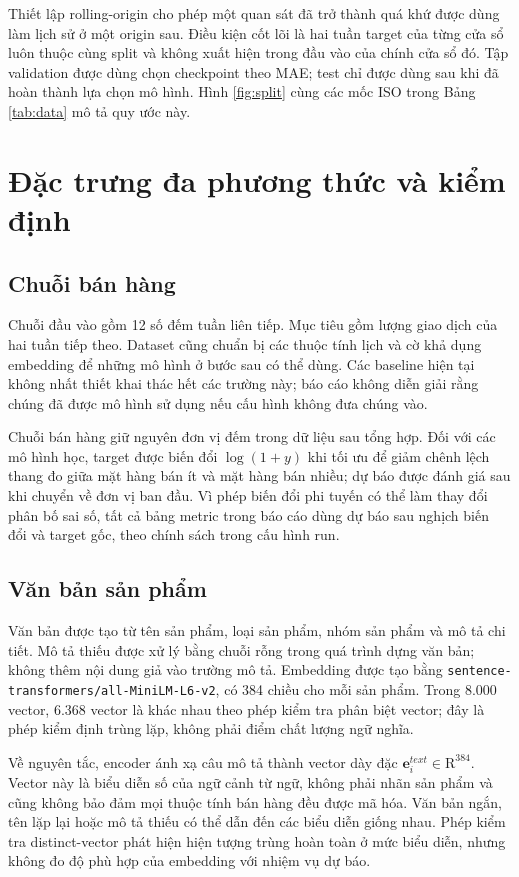\documentclass[12pt,a4paper,oneside]{article}
\begin{document}
Thiết lập rolling-origin cho phép một quan sát đã trở thành quá khứ được dùng làm lịch sử ở một origin sau. Điều kiện cốt lõi là hai tuần target của từng cửa sổ luôn thuộc cùng split và không xuất hiện trong đầu vào của chính cửa sổ đó. Tập validation được dùng chọn checkpoint theo MAE; test chỉ được dùng sau khi đã hoàn thành lựa chọn mô hình. Hình \ref{fig:split} cùng các mốc ISO trong Bảng \ref{tab:data} mô tả quy ước này.

\section{Đặc trưng đa phương thức và kiểm định}
\subsection{Chuỗi bán hàng}
Chuỗi đầu vào gồm 12 số đếm tuần liên tiếp. Mục tiêu gồm lượng giao dịch của hai tuần tiếp theo. Dataset cũng chuẩn bị các thuộc tính lịch và cờ khả dụng embedding để những mô hình ở bước sau có thể dùng. Các baseline hiện tại không nhất thiết khai thác hết các trường này; báo cáo không diễn giải rằng chúng đã được mô hình sử dụng nếu cấu hình không đưa chúng vào.

Chuỗi bán hàng giữ nguyên đơn vị đếm trong dữ liệu sau tổng hợp. Đối với các mô hình học, target được biến đổi $\log(1+y)$ khi tối ưu để giảm chênh lệch thang đo giữa mặt hàng bán ít và mặt hàng bán nhiều; dự báo được đánh giá sau khi chuyển về đơn vị ban đầu. Vì phép biến đổi phi tuyến có thể làm thay đổi phân bố sai số, tất cả bảng metric trong báo cáo dùng dự báo sau nghịch biến đổi và target gốc, theo chính sách trong cấu hình run.

\subsection{Văn bản sản phẩm}
Văn bản được tạo từ tên sản phẩm, loại sản phẩm, nhóm sản phẩm và mô tả chi tiết. Mô tả thiếu được xử lý bằng chuỗi rỗng trong quá trình dựng văn bản; không thêm nội dung giả vào trường mô tả. Embedding được tạo bằng \texttt{sentence-transformers/all-MiniLM-L6-v2}, có 384 chiều cho mỗi sản phẩm. Trong 8.000 vector, 6.368 vector là khác nhau theo phép kiểm tra phân biệt vector; đây là phép kiểm định trùng lặp, không phải điểm chất lượng ngữ nghĩa.

Về nguyên tắc, encoder ánh xạ câu mô tả thành vector dày đặc $\mathbf{e}^{text}_i\in\mathrm{R}^{384}$. Vector này là biểu diễn số của ngữ cảnh từ ngữ, không phải nhãn sản phẩm và cũng không bảo đảm mọi thuộc tính bán hàng đều được mã hóa. Văn bản ngắn, tên lặp lại hoặc mô tả thiếu có thể dẫn đến các biểu diễn giống nhau. Phép kiểm tra distinct-vector phát hiện hiện tượng trùng hoàn toàn ở mức biểu diễn, nhưng không đo độ phù hợp của embedding với nhiệm vụ dự báo.
\end{document}
